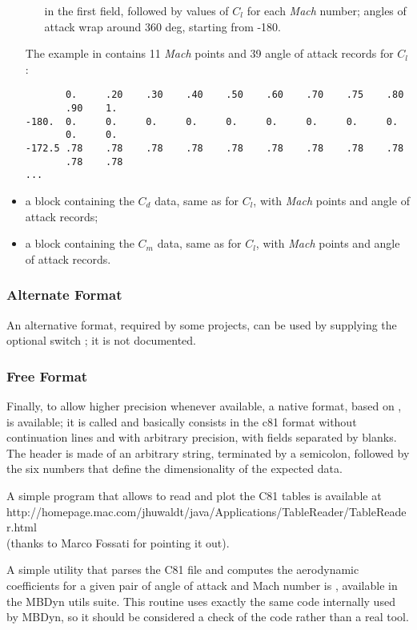 \begin{itemize}
\begin{itemize}
	in the first field, followed by  values of $C_l$
	for each \emph{Mach} number; angles of attack wrap around 
	360 deg, starting from -180.
	\end{itemize}
The example in  contains 11 \emph{Mach} points
and 39 angle of attack records for $C_l$:
{\small
\begin{verbatim}
       0.     .20    .30    .40    .50    .60    .70    .75    .80
       .90    1.
-180.  0.     0.     0.     0.     0.     0.     0.     0.     0.
       0.     0.
-172.5 .78    .78    .78    .78    .78    .78    .78    .78    .78
       .78    .78
...
\end{verbatim}
}
\item a block containing the $C_d$ data, same as for $C_l$,
with  \emph{Mach} points and  angle of attack records;
\item a block containing the $C_m$ data, same as for $C_l$,
with  \emph{Mach} points and  angle of attack records.
\end{itemize}

\subsubsection{Alternate Format}
An alternative format, required by some projects, can be used by supplying
the optional switch ; it is not documented.

\subsubsection{Free Format}
Finally, to allow higher precision whenever available, a native format,
based on , is available; it is called  and 
basically consists in the c81 format without continuation lines
and with arbitrary precision, with fields separated by blanks.
The header is made of an arbitrary string, terminated by a semicolon,
followed by the six numbers that define the dimensionality of the expected data.

A simple program that allows to read and plot the C81 tables
is available at \\
        {http://homepage.mac.com/jhuwaldt/java/Applications/TableReader/TableReader.html} \\
(thanks to Marco Fossati for pointing it out).

A simple utility that parses the C81 file and computes 
the aerodynamic coefficients for a given pair of angle of attack 
and Mach number is , available in the MBDyn utils suite.
This routine uses exactly the same code internally used by MBDyn,
so it should be considered a check of the code rather than a real tool.


